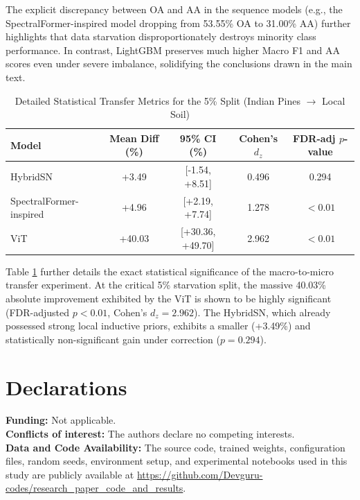 \documentclass[pdflatex,sn-mathphys-num,iicol]{sn-jnl}
\begin{document}
The explicit discrepancy between OA and AA in the sequence models (e.g., the SpectralFormer-inspired model dropping from 53.55\% OA to 31.00\% AA) further highlights that data starvation disproportionately destroys minority class performance. In contrast, LightGBM preserves much higher Macro F1 and AA scores even under severe imbalance, solidifying the conclusions drawn in the main text.

\begin{table}[t]
\centering
\caption{Detailed Statistical Transfer Metrics for the 5\% Split (Indian Pines $\rightarrow$ Local Soil)}\label{tab:transfer_stats}
\begin{tabular}{lcccc}
\toprule
\textbf{Model} & \textbf{Mean Diff (\%)} & \textbf{95\% CI (\%)} & \textbf{Cohen's $d_z$} & \textbf{FDR-adj $p$-value} \\
\midrule
HybridSN & +3.49 & [-1.54, +8.51] & 0.496 & 0.294 \\
SpectralFormer-inspired & +4.96 & [+2.19, +7.74] & 1.278 & $<0.01$ \\
ViT & +40.03 & [+30.36, +49.70] & 2.962 & $<0.01$ \\
\bottomrule
\end{tabular}
\end{table}

Table \ref{tab:transfer_stats} further details the exact statistical significance of the macro-to-micro transfer experiment. At the critical 5\% starvation split, the massive 40.03\% absolute improvement exhibited by the ViT is shown to be highly significant (FDR-adjusted $p < 0.01$, Cohen's $d_z = 2.962$). The HybridSN, which already possessed strong local inductive priors, exhibits a smaller (+3.49\%) and statistically non-significant gain under correction ($p = 0.294$).

\backmatter

\section*{Declarations}
\textbf{Funding:} Not applicable.\\
\textbf{Conflicts of interest:} The authors declare no competing interests.\\
\textbf{Data and Code Availability:} The source code, trained weights, configuration files, random seeds, environment setup, and experimental notebooks used in this study are publicly available at \url{https://github.com/Devguru-codes/research_paper_code_and_results}.
\end{document}
